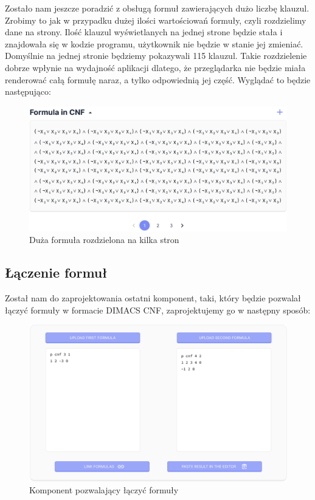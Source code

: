 \documentclass[a4paper,12pt,oneside]{book}
\theoremstyle{definition}
\begin{document}
Zostało nam jeszcze poradzić z obsługą formuł zawierających dużo liczbę klauzul. Zrobimy to jak w przypadku dużej ilości wartościowań formuły, czyli rozdzielimy dane na strony. Ilość klauzul wyświetlanych na jednej strone będzie stała i znajdowała się w kodzie programu, użytkownik nie będzie w stanie jej zmieniać. Domyślnie na jednej stronie będziemy pokazywali 115 klauzul. Takie rozdzielenie dobrze wpłynie na wydajność aplikacji dlatego, że przeglądarka nie będzie miała renderować całą formułę naraz, a tylko odpowiednią jej część. Wyglądać to będzie następująco:

\begin{figure}[ht]
    \centering
    \includegraphics[width=14.30cm]{12}
    \caption{Duża formuła rozdzielona na kilka stron}
    \label{fig:12}
\end{figure}

\newpage

\subsection{Łączenie formuł}

Został nam do zaprojektowania ostatni komponent, taki, który będzie pozwalał łączyć formuły w formacie DIMACS CNF, zaprojektujemy go w następny sposób: 

\begin{figure}[ht]
    \centering
    \includegraphics[width=14.30cm]{13}
    \caption{Komponent pozwalający łączyć formuły}
    \label{fig:13}
\end{figure}
\end{document}

